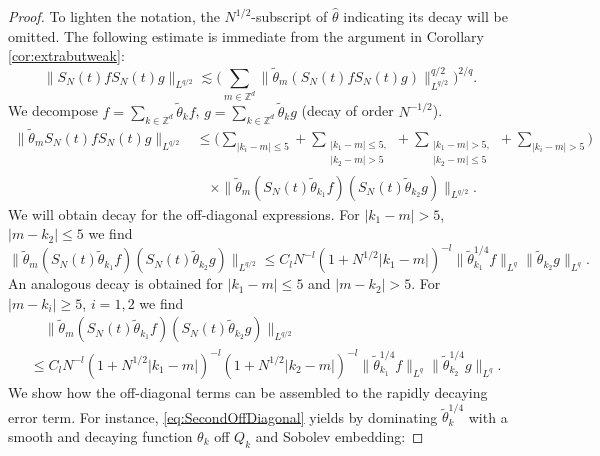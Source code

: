 \documentclass{amsart}
\numberwithin{equation}{section}
\theoremstyle{definition}
\newcommand{\Z}{\mathbb{Z}}
\begin{document}
\begin{proof}
To lighten the notation, the $N^{1/2}$-subscript of $\hat{\theta}$ indicating its decay will be omitted.
The following estimate is immediate from the argument in Corollary \ref{cor:extrabutweak}:
\begin{equation*}
    \| S_N(t) f S_N(t) g \|_{L^{q/2}} \lesssim \big( \sum_{m \in \Z^d} \| \tilde{\theta}_m (S_N(t) f S_N(t) g) \|_{L^{q/2}}^{q/2} \big)^{2/q}.
\end{equation*}
We decompose $f = \sum_{k \in \Z^d} \tilde{\theta}_k f$, $g = \sum_{k \in \Z^d} \tilde{\theta}_k g$ (decay of order $N^{-1/2}$).
\begin{equation*}
\begin{split}
    \| \tilde{\theta}_m S_N(t) f S_N(t) g \|_{L^{q/2}} &\leq \big( \sum_{|k_i-m| \leq 5} + \sum_{\substack{|k_1-m| \leq 5, \\ |k_2-m| > 5}} + \sum_{\substack{|k_1-m|>5, \\ |k_2-m| \leq 5}} +  \sum_{|k_i-m| >5} \big) \\
    &\quad \times \| \tilde{\theta}_m (S_N(t) \tilde{\theta}_{k_1} f) (S_N(t) \tilde{\theta}_{k_2} g) \|_{L^{q/2}}.
\end{split}
\end{equation*}
We will obtain decay for the off-diagonal expressions. For $|k_1-m| > 5$, $|m-k_2| \leq 5$ we find
\begin{equation}
    \label{eq:FirstOffDiagoanl} \| \tilde{\theta}_m (S_N(t) \tilde{\theta}_{k_1} f) (S_N(t) \tilde{\theta}_{k_2} g) \|_{L^{q/2}} \leq C_l N^{-l} (1+N^{1/2} |k_1-m|)^{-l} \| \tilde{\theta}_{k_1}^{1/4} f \|_{L^q} \| \tilde{\theta}_{k_2} g \|_{L^q}.
\end{equation}
An analogous decay is obtained for $|k_1-m| \leq 5$ and $|m-k_2| > 5$. For $|m-k_i| \geq 5$, $i=1,2$ we find
\begin{equation}
    \label{eq:SecondOffDiagonal}
    \begin{split}
    &\quad \| \tilde{\theta}_m (S_N(t) \tilde{\theta}_{k_1} f) (S_N(t) \tilde{\theta}_{k_2} g) \|_{L^{q/2}} \\
    &\leq C_l N^{-l} (1+N^{1/2} |k_1-m|)^{-l} (1+N^{1/2} |k_2-m|)^{-l} \| \tilde{\theta}_{k_1}^{1/4} f \|_{L^q} \| \tilde{\theta}^{1/4}_{k_2} g \|_{L^q}.
    \end{split}
\end{equation}
We show how the off-diagonal terms can be assembled to the rapidly decaying error term. For instance, \eqref{eq:SecondOffDiagonal} yields by dominating $\tilde{\theta}_k^{1/4}$ with a smooth and decaying function $\theta_k$ off $Q_k$ and Sobolev embedding:

\end{proof}
\end{document}
